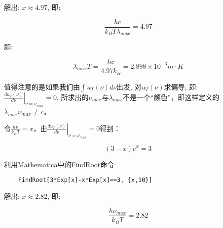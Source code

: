 \begin{enumerate}
解出: $x \approx 4.97$, 即:

\begin{equation*}
\frac{hc}{k_B T \lambda_{max}} = 4.97
\end{equation*}

即:

\begin{equation*}
    \lambda_{max} T =\frac{hc}{4.97 k_B} = 2.898 \times 10^{-3} m \cdot K
\end{equation*}

值得注意的是如果我们由$\int u_T(\nu) d \nu$出发, 对$u_T(\nu)$求偏导, 即: $\left.{ \frac{d u_T(\nu)}{d \nu}} \right|_{\nu = \nu_{max}}= 0$, 所求出的$\nu_{max}$与$\lambda_{max}$不是一个“颜色”，即这样定义的$\lambda_{max} \nu_{max} \neq c$。

令$\frac{h\nu}{k_BT} = x $，由$\left.{ \frac{d u_T(\nu)}{d \nu}} \right|_{\nu = \nu_{max}}= 0$得到：

\begin{equation*}
    (3-x)e^x = 3
\end{equation*}

利用Mathematica中的FindRoot命令

\begin{verbatim}
    FindRoot[3*Exp[x]-x*Exp[x]==3, {x,10}]
\end{verbatim}

解出: $x \approx 2.82 $, 即:


\begin{equation*}
\frac{h\nu_{max}}{k_BT} = 2.82
\end{equation*}

\end{enumerate}
